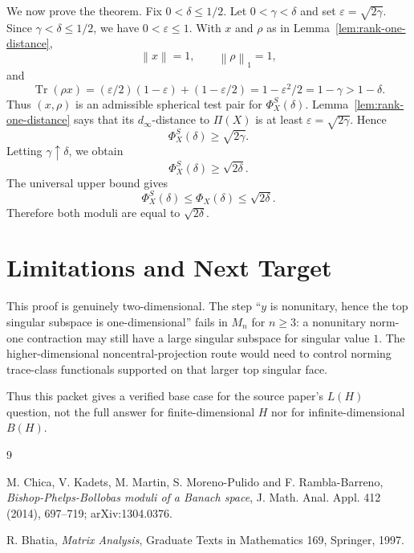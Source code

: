 \documentclass[11pt]{article}
\newcommand{\Tr}{\operatorname{Tr}}
\newcommand{\norm}[1]{\left\lVert #1 \right\rVert}
\newcommand{\eps}{\varepsilon}
\begin{document}
We now prove the theorem. Fix \(0<\delta\leq1/2\). Let \(0<\gamma<\delta\)
and set \(\eps=\sqrt{2\gamma}\). Since \(\gamma<\delta\leq1/2\), we have
\(0<\eps\leq1\). With \(x\) and \(\rho\) as in Lemma~\ref{lem:rank-one-distance},
\[
  \norm{x}=1,\qquad \norm{\rho}_1=1,
\]
and
\[
  \Tr(\rho x)
  =(\eps/2)(1-\eps)+(1-\eps/2)
  =1-\eps^2/2
  =1-\gamma
  >1-\delta .
\]
Thus \((x,\rho)\) is an admissible spherical test pair for
\(\Phi_X^S(\delta)\). Lemma~\ref{lem:rank-one-distance} says that its
\(d_\infty\)-distance to \(\Pi(X)\) is at least \(\eps=\sqrt{2\gamma}\).
Hence
\[
  \Phi_X^S(\delta)\geq \sqrt{2\gamma}.
\]
Letting \(\gamma\uparrow\delta\), we obtain
\[
  \Phi_X^S(\delta)\geq\sqrt{2\delta}.
\]
The universal upper bound gives
\[
  \Phi_X^S(\delta)\leq\Phi_X(\delta)\leq\sqrt{2\delta}.
\]
Therefore both moduli are equal to \(\sqrt{2\delta}\).

\section*{Limitations and Next Target}

This proof is genuinely two-dimensional. The step ``\(y\) is nonunitary,
hence the top singular subspace is one-dimensional'' fails in \(M_n\) for
\(n\geq3\): a nonunitary norm-one contraction may still have a large
singular subspace for singular value \(1\). The higher-dimensional
noncentral-projection route would need to control norming trace-class
functionals supported on that larger top singular face.

Thus this packet gives a verified base case for the source paper's
\(L(H)\) question, not the full answer for finite-dimensional \(H\) nor for
infinite-dimensional \(B(H)\).

\begin{thebibliography}{9}

M. Chica, V. Kadets, M. Martin, S. Moreno-Pulido and F. Rambla-Barreno,
\emph{Bishop-Phelps-Bollobas moduli of a Banach space},
J. Math. Anal. Appl. 412 (2014), 697--719; arXiv:1304.0376.

R. Bhatia,
\emph{Matrix Analysis},
Graduate Texts in Mathematics 169, Springer, 1997.

\end{thebibliography}
\end{document}
